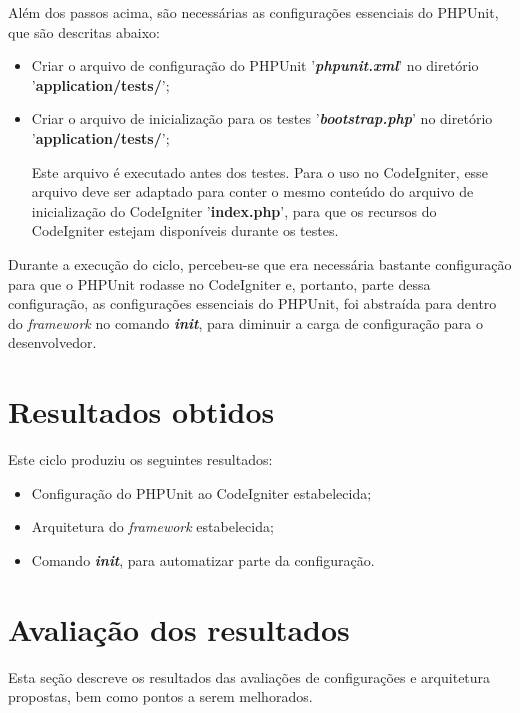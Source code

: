 	  Além dos passos acima, são necessárias as configurações essenciais do PHPUnit, que são descritas abaixo:
	  
	  \begin{itemize}
	    \item Criar o arquivo de configuração do PHPUnit '\textbf{\textit{phpunit.xml}}' 
		  no diretório '\textbf{application/tests/}';
	    
	    \item Criar o arquivo de inicialização para os testes '\textbf{\textit{bootstrap.php}}'
		  no diretório '\textbf{application/tests/}';
	      
		\subitem Este arquivo é executado antes dos testes. Para o uso no CodeIgniter, esse arquivo deve ser
			 adaptado para conter o mesmo conteúdo do arquivo de inicialização do CodeIgniter '\textbf{index.php}', 
			 para que os recursos do CodeIgniter estejam disponíveis durante os testes.
	  \end{itemize}
	  
	  Durante a execução do ciclo, percebeu-se que era necessária bastante configuração para que o PHPUnit rodasse no
	  CodeIgniter e, portanto, parte dessa configuração, as configurações essenciais do PHPUnit, foi abstraída para
	  dentro do \textit{framework} no comando \textit{\textbf{init}}, para diminuir a carga de configuração
	  para o desenvolvedor.
 
  \section{Resultados obtidos}
    
      Este ciclo produziu os seguintes resultados:
      
      \begin{itemize}

    \item Configuração do PHPUnit ao CodeIgniter estabelecida;
    
    \item Arquitetura do \textit{framework} estabelecida;
    
    \item Comando \textit{\textbf{init}}, para automatizar parte da configuração.

      \end{itemize}

  \section{Avaliação dos resultados}
      Esta seção descreve os resultados das avaliações de configurações e arquitetura propostas, bem como pontos a serem melhorados.

